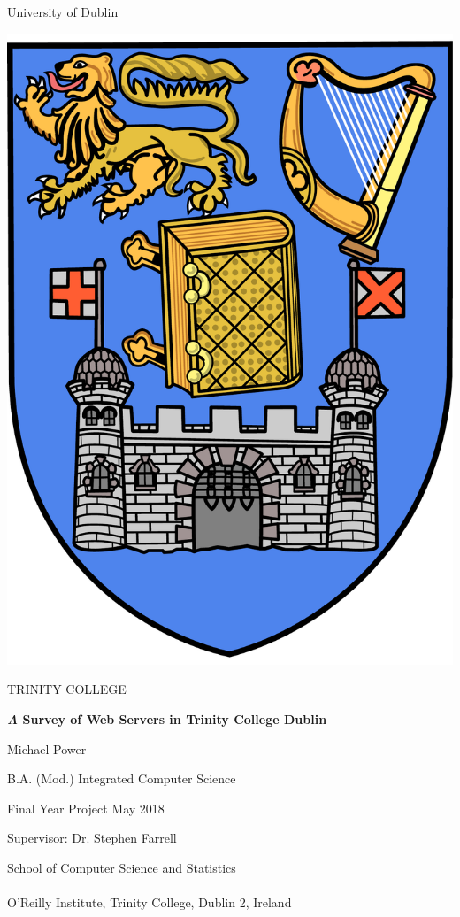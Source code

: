 \documentclass[a4wide,leqno,12pt]{report}
\begin{document}
\bgroup %
\linespread{0}
\thispagestyle{empty}
\begin{center}
{\sffamily
{\Large University of Dublin}

\vspace{10pt}

\includegraphics[scale=0.12]{images/trinitycollege.pdf}

\vspace{10pt}

{\Huge TRINITY COLLEGE}

\vspace{80pt}

\textbf{ \Large \emph A Survey of Web Servers in Trinity College Dublin}

\vspace{30pt}

Michael Power

B.A. (Mod.) Integrated Computer Science

Final Year Project May 2018

Supervisor: Dr. Stephen Farrell

\vspace{110pt}

\large{School of Computer Science and Statistics
\\$ $\\
O'Reilly Institute, Trinity College, Dublin 2, Ireland}
\linespread{1}
}
\end{center}
\egroup %
\end{document}
